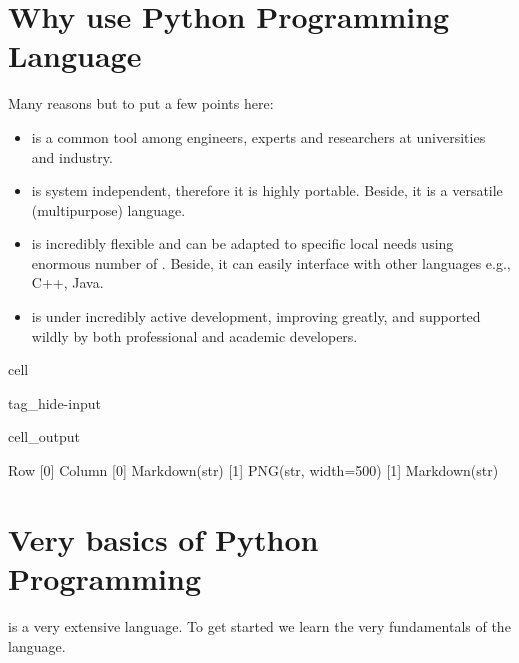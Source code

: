 \documentclass[letterpaper,10pt,english]{jupyterBook}
\begin{document}
\section{Why use Python Programming Language}
\label{\detokenize{content/background/01_python:why-use-python-programming-language}}
\sphinxAtStartPar
Many reasons but to put a few points here:
\begin{itemize}
\item {} 
\sphinxAtStartPar
{} is a common tool among engineers, experts and researchers at universities and industry.

\item {} 
\sphinxAtStartPar
{} is system independent, therefore it is highly portable. Beside, it is a versatile (multi\sphinxhyphen{}purpose) language.

\item {} 
\sphinxAtStartPar
{} is incredibly flexible and can be adapted to specific local needs using enormous number of . Beside, it can easily interface with other languages e.g., C++, Java.

\item {} 
\sphinxAtStartPar
{} is under incredibly active development, improving greatly, and supported wildly by both professional and academic developers.

\end{itemize}

\begin{sphinxuseclass}{cell}
\begin{sphinxuseclass}{tag_hide-input}\begin{sphinxVerbatimOutput}

\begin{sphinxuseclass}{cell_output}
\begin{sphinxVerbatim}[commandchars=\\\{\}]
Row
    [0] Column
        [0] Markdown(str)
        [1] PNG(str, width=500)
    [1] Markdown(str)
\end{sphinxVerbatim}

\end{sphinxuseclass}\end{sphinxVerbatimOutput}

\end{sphinxuseclass}
\end{sphinxuseclass}

\section{Very basics of Python Programming}
\label{\detokenize{content/background/01_python:very-basics-of-python-programming}}
\sphinxAtStartPar
{} is a very extensive language. To get started we learn the very fundamentals of the language.
\end{document}

